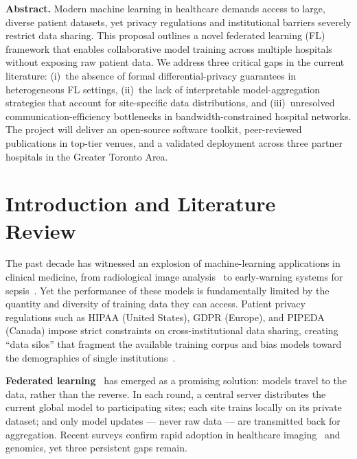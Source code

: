 \documentclass[11pt,a4paper]{article}
\begin{document}
{\begin{abstractbox}
{\bfseries\color{accent}Abstract.}\enspace
Modern machine learning in healthcare demands access to large, diverse patient datasets,
yet privacy regulations and institutional barriers severely restrict data sharing. This
proposal outlines a novel federated learning (FL) framework that enables collaborative
model training across multiple hospitals without exposing raw patient data. We address
three critical gaps in the current literature: (i)~the absence of formal differential-privacy
guarantees in heterogeneous FL settings, (ii)~the lack of interpretable model-aggregation
strategies that account for site-specific data distributions, and (iii)~unresolved
communication-efficiency bottlenecks in bandwidth-constrained hospital networks. The
project will deliver an open-source software toolkit, peer-reviewed publications in top-tier
venues, and a validated deployment across three partner hospitals in the Greater Toronto Area.
\end{abstractbox}


\section{Introduction and Literature Review}

The past decade has witnessed an explosion of machine-learning applications in clinical
medicine, from radiological image analysis~\cite{esteva2017} to early-warning systems for
sepsis~\cite{reynolds2024}. Yet the performance of these models is fundamentally limited by
the quantity and diversity of training data they can access. Patient privacy regulations
such as HIPAA (United States), GDPR (Europe), and PIPEDA (Canada) impose strict constraints
on cross-institutional data sharing, creating ``data silos'' that fragment the available
training corpus and bias models toward the demographics of single institutions~\cite{rieke2020}.

\textbf{Federated learning}~\cite{mcmahan2017} has emerged as a promising solution: models
travel to the data, rather than the reverse. In each round, a central server distributes the
current global model to participating sites; each site trains locally on its private dataset;
and only model updates — never raw data — are transmitted back for aggregation. Recent
surveys confirm rapid adoption in healthcare imaging~\cite{sheller2020} and genomics, yet
three persistent gaps remain.

}
\end{document}
